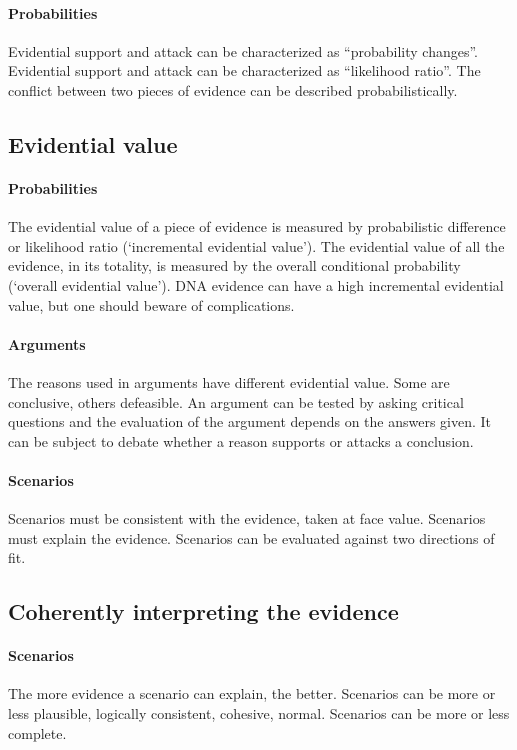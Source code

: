 \documentclass[10pt]{article}
\begin{document}
\paragraph{Probabilities}
	Evidential support and attack can be characterized as ``probability changes''.
	Evidential support and attack can be characterized as ``likelihood ratio''.
	The conflict between two pieces of evidence can be described probabilistically.

\subsection*{Evidential value}

\paragraph{Probabilities}
The evidential value of a piece of evidence is measured by probabilistic difference or likelihood ratio (`incremental evidential value').
	The evidential value of all the evidence, in its totality, is measured by the overall conditional probability (`overall evidential value'). 
	DNA evidence can have a high incremental evidential value, but one should beware of complications.
	
\paragraph{Arguments}
	The reasons used in arguments have different evidential value. Some are conclusive, others defeasible.
	An argument can be tested by asking critical questions and the evaluation of the argument depends on the answers given.
	It can be subject to debate whether a reason supports or attacks a conclusion.
	
\paragraph{Scenarios}
	Scenarios must be consistent with the evidence, taken at face value.
	Scenarios must explain the evidence.
	Scenarios can be evaluated against two directions of fit.
	
\subsection*{Coherently interpreting the evidence}

\paragraph{Scenarios}
	The more evidence a scenario can explain, the better.
	Scenarios can be more or less plausible, logically consistent, cohesive, normal.
	Scenarios can be more or less complete.
	
\end{document}
